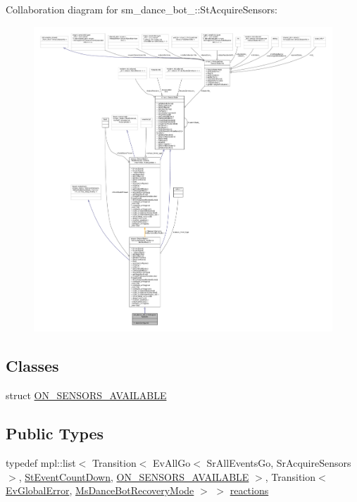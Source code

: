 Collaboration diagram for sm\+\_\+dance\+\_\+bot\+\_\+:\+:St\+Acquire\+Sensors\+:
\nopagebreak
\begin{figure}[H]
\begin{center}
\leavevmode
\includegraphics[width=350pt]{structsm__dance__bot__2_1_1StAcquireSensors__coll__graph}
\end{center}
\end{figure}
\subsection*{Classes}
\begin{DoxyCompactItemize}
\item 
struct \hyperlink{structsm__dance__bot__2_1_1StAcquireSensors_1_1ON__SENSORS__AVAILABLE}{O\+N\+\_\+\+S\+E\+N\+S\+O\+R\+S\+\_\+\+A\+V\+A\+I\+L\+A\+B\+LE}
\end{DoxyCompactItemize}
\subsection*{Public Types}
\begin{DoxyCompactItemize}
\item 
typedef mpl\+::list$<$ Transition$<$ Ev\+All\+Go$<$ Sr\+All\+Events\+Go, Sr\+Acquire\+Sensors $>$, \hyperlink{structsm__dance__bot__2_1_1StEventCountDown}{St\+Event\+Count\+Down}, \hyperlink{structsm__dance__bot__2_1_1StAcquireSensors_1_1ON__SENSORS__AVAILABLE}{O\+N\+\_\+\+S\+E\+N\+S\+O\+R\+S\+\_\+\+A\+V\+A\+I\+L\+A\+B\+LE} $>$, Transition$<$ \hyperlink{structsm__dance__bot__2_1_1EvGlobalError}{Ev\+Global\+Error}, \hyperlink{classsm__dance__bot__2_1_1MsDanceBotRecoveryMode}{Ms\+Dance\+Bot\+Recovery\+Mode} $>$ $>$ \hyperlink{structsm__dance__bot__2_1_1StAcquireSensors_ac3cddfc8cddd50823cee34f0305eaf31}{reactions}
\end{DoxyCompactItemize}
